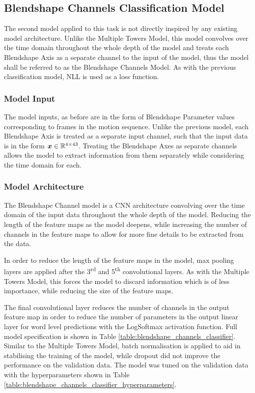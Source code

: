 \subsection{Blendshape Channels Classification Model}\label{secc:blendshape_channels_model}
The second model applied to this task is not directly inspired by any existing model architecture.
Unlike the Multiple Towers Model, this model convolves over the time domain throughout the whole depth of the model and treats each Blendshape Axis as a separate channel to the input of the model, thus the model shall be referred to as the Blendshape Channels Model.
As with the previous classification model, NLL is used as a loss function.

\subsubsection{Model Input}
The model inputs, as before are in the form of Blendshape Parameter values corresponding to frames in the motion sequence.
Unlike the previous model, each Blendshape Axis is treated as a separate input channel, such that the input data is in the form ${\boldsymbol{{x}}} \in \mathbb{R}^{4 \times 43}$.
Treating the Blendshape Axes as separate channels allows the model to extract information from them separately while considering the time domain for each.

\subsubsection{Model Architecture}
The Blendshape Channel model is a CNN architecture convolving over the time domain of the input data throughout the whole depth of the model.
Reducing the length of the feature maps as the model deepens, while increasing the number of channels in the feature maps to allow for more fine details to be extracted from the data.

In order to reduce the length of the feature maps in the model, max pooling layers are applied after the 3\textsuperscript{rd} and 5\textsuperscript{th} convolutional layers.
As with the Multiple Towers Model, this forces the model to discard information which is of less importance, while reducing the size of the feature maps.

The final convolutional layer reduces the number of channels in the output feature map in order to reduce the number of parameters in the output linear layer for word level predictions with the LogSoftmax activation function.
Full model specification is shown in Table \ref{table:blendshape_channels_classifier}.
Similar to the Multiple Towers Model, batch normalisation is applied to aid in stabilising the training of the model, while dropout did not improve the performance on the validation data.
The model was tuned on the validation data with the hyperparameters shown in Table \ref{table:blendshape_channels_classifier_hyperparameters}.

